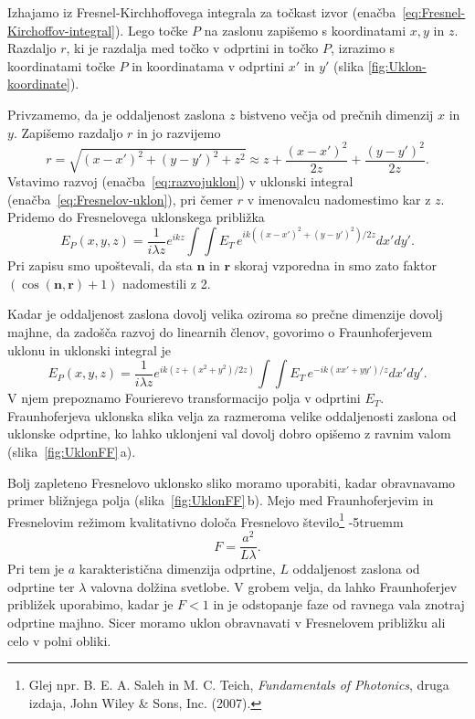Izhajamo iz Fresnel-Kirchhoffovega integrala za točkast izvor
(enačba~\ref{eq:Fresnel-Kirchoffov-integral}). Lego točke $P$ na zaslonu zapišemo 
s koordinatami $x,y$ in $z$. Razdaljo $r$, ki je razdalja med točko v odprtini
in točko $P$, izrazimo s koordinatami točke $P$ in koordinatama v odprtini $x'$ in $y'$ 
 (slika \ref{fig:Uklon-koordinate}). 
 
 Privzamemo,
da je oddaljenost zaslona $z$ bistveno večja od prečnih dimenzij $x$ in $y$. 
Zapišemo razdaljo $r$ in jo razvijemo
\begin{equation}
r = \sqrt{(x-x')^2+(y-y')^2 + z^2} \approx z + \frac{(x-x')^2}{2z} +\frac{(y-y')^2}{2z}.
\label{eq:razvojuklon}
\end{equation}
Vstavimo razvoj (enačba~\ref{eq:razvojuklon}) v uklonski integral (enačba~\ref{eq:Fresnelov-uklon}), 
pri čemer $r$ v imenovalcu nadomestimo kar z $z$. Pridemo do Fresnelovega uklonskega približka 
\begin{equation}
\label{eq:FresnelApprox}
E_P(x,y,z) =  \frac{1}{i \lambda z } e^{i k z}\int \int E_T\, e^{ik ((x-x')^2+(y-y')^2)/2z} dx' dy'.
\end{equation}
Pri zapisu smo upoštevali, da sta $\mathbf{n}$ in $\mathbf{r}$ skoraj vzporedna in smo zato faktor
$\left(\cos(\mathbf{n},\mathbf{r})+1\right)$ nadomestili z 2.

Kadar je oddaljenost zaslona dovolj velika oziroma so prečne dimenzije dovolj majhne, da zadošča 
razvoj do linearnih členov, govorimo o Fraunhoferjevem uklonu in uklonski integral je
\begin{equation}
\label{eq:FraunhoferApprox}
E_P(x,y,z) =  \frac{1}{i\lambda z} e^{i k (z + (x^2+y^2) /2z)}\int \int E_T\,
e^{-ik (xx'+yy')/z} dx' dy'.
\end{equation}
V njem  prepoznamo Fourierevo transformacijo polja v odprtini $E_T$.
Fraunhoferjeva uklonska slika velja za razmeroma velike oddaljenosti
zaslona od uklonske odprtine, ko lahko uklonjeni val dovolj dobro opišemo z ravnim valom
(slika~\ref{fig:UklonFF}\,a). 

Bolj zapleteno Fresnelovo uklonsko sliko moramo uporabiti, kadar obravnavamo 
primer bližnjega polja (slika~\ref{fig:UklonFF}\,b). 
Mejo med Fraunhoferjevim in Fresnelovim režimom kvalitativno določa Fresnelovo
število\footnote{Glej npr. B. E. A. Saleh in M. C. Teich, 
{\it Fundamentals of Photonics}, druga izdaja, John Wiley \& Sons, Inc. (2007).}
\vglue-5truemm
\begin{equation}
F= \frac{a^2}{L\lambda}.
\label{eq:Fst}
\end{equation} 
Pri tem je $a$ karakteristična dimenzija odprtine, $L$ oddaljenost zaslona 
od odprtine ter $\lambda$ valovna dolžina svetlobe. V grobem velja, da lahko 
Fraunhoferjev približek uporabimo, kadar je $F<1$ in je odstopanje faze od ravnega vala 
znotraj odprtine majhno. Sicer moramo uklon obravnavati v Fresnelovem približku ali 
celo v polni obliki. 

